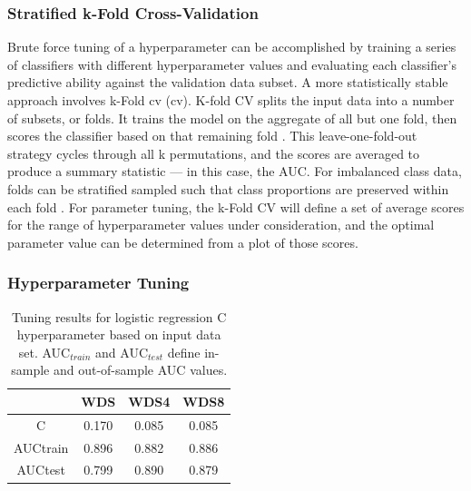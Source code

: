 \subsubsection{Stratified k-Fold Cross-Validation} \label{ch5:strat_kfold_cv}

Brute force tuning of a hyperparameter can be accomplished by training a series of classifiers with different hyperparameter values and evaluating each classifier's predictive ability against the validation data subset. A more statistically stable approach involves k-Fold \acrlong{cv} (\acrshort{cv}). K-fold CV splits the input data into a number of subsets, or folds. It trains the model on the aggregate of all but one fold, then scores the classifier based on that remaining fold \citep[p. 181]{james_introduction_2013}. This leave-one-fold-out strategy cycles through all k permutations, and the scores are averaged to produce a summary statistic --- in this case, the AUC. For imbalanced class data, folds can be stratified sampled such that class proportions are preserved within each fold \citep{brownlee_how_2020}. For parameter tuning, the k-Fold CV will define a set of average scores for the range of hyperparameter values under consideration, and the optimal parameter value can be determined from a plot of those scores.

\subsubsection{Hyperparameter Tuning} \label{ch5:hyper_tuning}
\begin{table}
\centering
\begin{tabular}{c|c|c|c|}
\cline{2-4}
                                 & WDS   & WDS4  & WDS8  \\ \hline
\multicolumn{1}{|c|}{C}          & 0.170 & 0.085 & 0.085 \\ \hline
\multicolumn{1}{|c|}{AUCtrain} & 0.896 & 0.882 & 0.886 \\ \hline
\multicolumn{1}{|c|}{AUCtest}  & 0.799 & 0.890 & 0.879 \\ \hline
\end{tabular}
\singlespacing
\caption[Logistic regression tuning results]{Tuning results for logistic regression C hyperparameter based on input data set. AUC$_{train}$ and AUC$_{test}$ define in-sample and out-of-sample AUC values.}
\label{tab:logreg_tuning}
\end{table}

